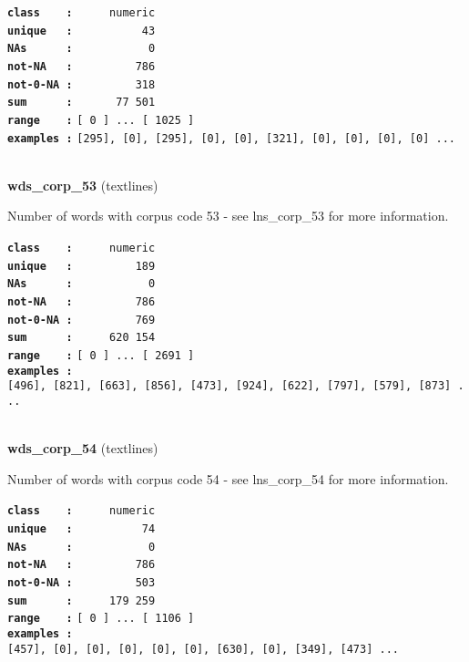 \documentclass[]{article}
\begin{document}
\textbf{\texttt{class\ \ \ \ :}} \texttt{~~~~~numeric}\\
\textbf{\texttt{unique\ \ \ :}} \texttt{~~~~~~~~~~43}\\
\textbf{\texttt{NAs\ \ \ \ \ \ :}} \texttt{~~~~~~~~~~~0}\\
\textbf{\texttt{not-NA\ \ \ :}} \texttt{~~~~~~~~~786}\\
\textbf{\texttt{not-0-NA\ :}} \texttt{~~~~~~~~~318}\\
\textbf{\texttt{sum\ \ \ \ \ \ :}} \texttt{~~~~~~77~501}\\
\textbf{\texttt{range\ \ \ \ :}}
\texttt{{[}\ 0\ {]}\ ...\ {[}\ 1025\ {]}}\\
\textbf{\texttt{examples\ :}}
\texttt{{[}295{]},\ {[}0{]},\ {[}295{]},\ {[}0{]},\ {[}0{]},\ {[}321{]},\ {[}0{]},\ {[}0{]},\ {[}0{]},\ {[}0{]}\ ...}\\

~

\textbf{wds\_corp\_53} (textlines)

Number of words with corpus code 53 - see lns\_corp\_53 for more
information.

\textbf{\texttt{class\ \ \ \ :}} \texttt{~~~~~numeric}\\
\textbf{\texttt{unique\ \ \ :}} \texttt{~~~~~~~~~189}\\
\textbf{\texttt{NAs\ \ \ \ \ \ :}} \texttt{~~~~~~~~~~~0}\\
\textbf{\texttt{not-NA\ \ \ :}} \texttt{~~~~~~~~~786}\\
\textbf{\texttt{not-0-NA\ :}} \texttt{~~~~~~~~~769}\\
\textbf{\texttt{sum\ \ \ \ \ \ :}} \texttt{~~~~~620~154}\\
\textbf{\texttt{range\ \ \ \ :}}
\texttt{{[}\ 0\ {]}\ ...\ {[}\ 2691\ {]}}\\
\textbf{\texttt{examples\ :}}
\texttt{{[}496{]},\ {[}821{]},\ {[}663{]},\ {[}856{]},\ {[}473{]},\ {[}924{]},\ {[}622{]},\ {[}797{]},\ {[}579{]},\ {[}873{]}\ ...}\\

~

\textbf{wds\_corp\_54} (textlines)

Number of words with corpus code 54 - see lns\_corp\_54 for more
information.

\textbf{\texttt{class\ \ \ \ :}} \texttt{~~~~~numeric}\\
\textbf{\texttt{unique\ \ \ :}} \texttt{~~~~~~~~~~74}\\
\textbf{\texttt{NAs\ \ \ \ \ \ :}} \texttt{~~~~~~~~~~~0}\\
\textbf{\texttt{not-NA\ \ \ :}} \texttt{~~~~~~~~~786}\\
\textbf{\texttt{not-0-NA\ :}} \texttt{~~~~~~~~~503}\\
\textbf{\texttt{sum\ \ \ \ \ \ :}} \texttt{~~~~~179~259}\\
\textbf{\texttt{range\ \ \ \ :}}
\texttt{{[}\ 0\ {]}\ ...\ {[}\ 1106\ {]}}\\
\textbf{\texttt{examples\ :}}
\texttt{{[}457{]},\ {[}0{]},\ {[}0{]},\ {[}0{]},\ {[}0{]},\ {[}0{]},\ {[}630{]},\ {[}0{]},\ {[}349{]},\ {[}473{]}\ ...}\\
\end{document}
